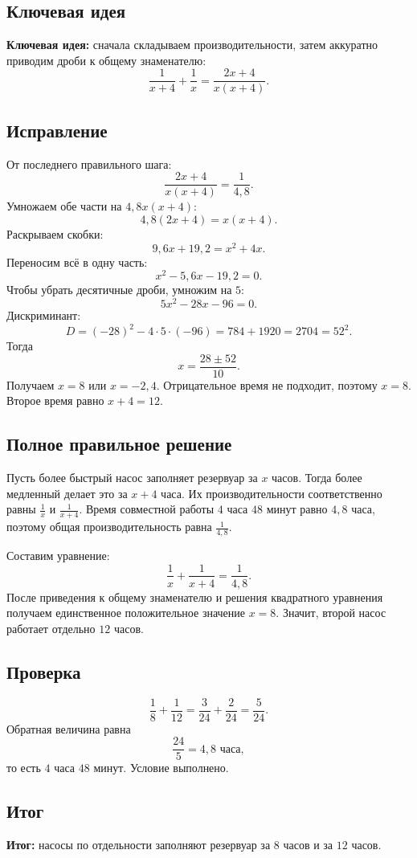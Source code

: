 \documentclass[12pt,a4paper]{article}
\newcommand{\idea}{\textcolor{blue!60!black}{\textbf{Ключевая идея:}}}
\newcommand{\result}{\textcolor{teal!60!black}{\textbf{Итог:}}}
\begin{document}
\subsection*{Ключевая идея}
\idea{} сначала складываем производительности, затем аккуратно приводим дроби к общему знаменателю:
\[
\frac{1}{x+4}+\frac{1}{x}=\frac{2x+4}{x(x+4)}.
\]

\subsection*{Исправление}
От последнего правильного шага:
\[
\frac{2x+4}{x(x+4)}=\frac{1}{4{,}8}.
\]
Умножаем обе части на $4{,}8x(x+4)$:
\[
4{,}8(2x+4)=x(x+4).
\]
Раскрываем скобки:
\[
9{,}6x+19{,}2=x^2+4x.
\]
Переносим всё в одну часть:
\[
x^2-5{,}6x-19{,}2=0.
\]
Чтобы убрать десятичные дроби, умножим на $5$:
\[
5x^2-28x-96=0.
\]
Дискриминант:
\[
D=(-28)^2-4\cdot5\cdot(-96)=784+1920=2704=52^2.
\]
Тогда
\[
x=\frac{28\pm52}{10}.
\]
Получаем $x=8$ или $x=-2{,}4$. Отрицательное время не подходит, поэтому $x=8$.
Второе время равно $x+4=12$.

\subsection*{Полное правильное решение}
Пусть более быстрый насос заполняет резервуар за $x$ часов. Тогда более медленный делает это за $x+4$ часа. Их производительности соответственно равны $\frac{1}{x}$ и $\frac{1}{x+4}$. Время совместной работы $4$ часа $48$ минут равно $4{,}8$ часа, поэтому общая производительность равна $\frac{1}{4{,}8}$.

Составим уравнение:
\[
\frac{1}{x}+\frac{1}{x+4}=\frac{1}{4{,}8}.
\]
После приведения к общему знаменателю и решения квадратного уравнения получаем единственное положительное значение $x=8$. Значит, второй насос работает отдельно $12$ часов.

\subsection*{Проверка}
\[
\frac{1}{8}+\frac{1}{12}=\frac{3}{24}+\frac{2}{24}=\frac{5}{24}.
\]
Обратная величина равна
\[
\frac{24}{5}=4{,}8 \text{ часа},
\]
то есть $4$ часа $48$ минут. Условие выполнено.

\subsection*{Итог}
\result{} насосы по отдельности заполняют резервуар за $8$ часов и за $12$ часов.
\end{document}
